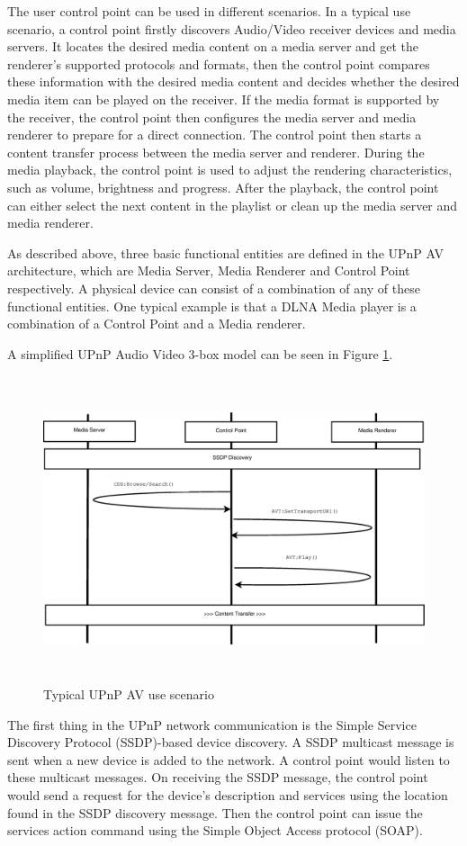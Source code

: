 The user control point can be used in different scenarios. In a typical use
scenario, a control point firstly discovers Audio/Video receiver devices and
media servers. It locates the desired media content on a media server and get
the renderer's supported protocols and formats, then the control point compares
these information with the desired media content and decides whether the desired
media item can be played on the receiver. If the media format is supported by
the receiver, the control point then configures the media server and media
renderer to prepare for a direct connection. The control point then starts a
content transfer process between the media server and renderer. During the
media playback, the control point is used to adjust the rendering
characteristics, such as volume, brightness and progress. After the playback,
the control point can either select the next content in the playlist or clean up
the media server and media renderer.

As described above, three basic functional entities are defined in the UPnP AV 
architecture\cite{upnp-av}, which are Media Server, Media Renderer and Control Point respectively.
A physical device can consist of a combination of any of these functional 
entities. One typical example is that a DLNA Media player is a combination of a Control 
Point and a Media renderer.

A simplified UPnP Audio Video 3-box model \cite{DLNA_proxy} can be 
seen in Figure \ref{av_use_scenario}.
\begin{figure}[htb] 
\centering \includegraphics[height=9cm]{charts/chart1} 
\caption{Typical UPnP AV use scenario \label{av_use_scenario}} 
\end{figure} 
The first thing in the UPnP network communication is the Simple Service
Discovery Protocol (SSDP)-based device discovery. A SSDP multicast message is
sent when a new device is added to the network. A control point would listen to these 
multicast messages. On receiving the SSDP message, the control point would send a request for the device's description and services using the location found in the SSDP discovery message. Then the control point can issue the services action command using the Simple Object Access protocol (SOAP).

